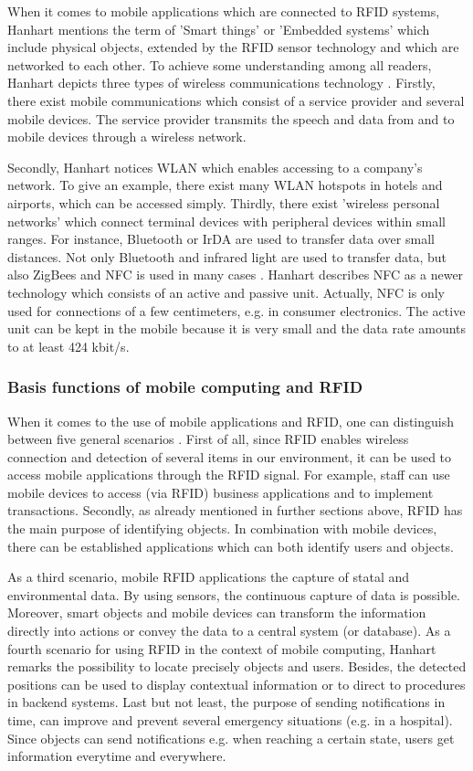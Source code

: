 When it comes to mobile applications which are connected to RFID systems, Hanhart mentions the term of 'Smart things' or 'Embedded systems' which include physical objects, extended by the RFID sensor technology and which are networked to each other. To achieve some understanding among all readers, Hanhart depicts three types of wireless communications technology \cite[p.12-13]{mobile}. Firstly, there exist mobile communications which consist of a service provider and several mobile devices. The service provider transmits the speech and data from and to mobile devices through a wireless network. 

Secondly, Hanhart notices \ac{WLAN} which enables accessing to a company's network. To give an example, there exist many WLAN hotspots in hotels and airports, which can be accessed simply. Thirdly, there exist 'wireless personal networks' which connect terminal devices with peripheral devices within small ranges. For instance, Bluetooth or \ac{IrDA} are used to transfer data over small distances. Not only Bluetooth and infrared light are used to transfer data, but also ZigBees and \ac{NFC} is used in many cases \cite[p.12-13]{mobile}. Hanhart describes NFC as a newer technology which consists of an active and passive unit. Actually, NFC is only used for connections of a few centimeters, e.g. in consumer electronics. The active unit can be kept in the mobile because it is very small and the data rate amounts to at least 424 kbit/s.
 
\subsubsection{Basis functions of mobile computing and RFID}

When it comes to the use of mobile applications and RFID, one can distinguish between five general scenarios \cite[p.13 ff.]{mobile}. First of all, since RFID enables wireless connection and detection of several items in our environment, it can be used to access mobile applications through the RFID signal. For example, staff can use mobile devices to access (via RFID) business applications and to implement transactions. Secondly, as already mentioned in further sections above, RFID has the main purpose of identifying objects. In combination with mobile devices, there can be established applications which can both identify users and objects.

As a third scenario, mobile RFID applications the capture of statal and environmental data. By using sensors, the continuous capture of data is possible. Moreover, smart objects and mobile devices can transform the information directly into actions or convey the data to a central system (or database). As a fourth scenario for using RFID in the context of mobile computing, Hanhart \cite[p.13 ff.]{mobile} remarks the possibility to locate precisely objects and users. Besides, the detected positions can be used to display contextual information or to direct to procedures in backend systems. Last but not least, the purpose of sending notifications in time, can improve and prevent several emergency situations (e.g. in a hospital). Since objects can send notifications e.g. when reaching a certain state, users get information everytime and everywhere.  

